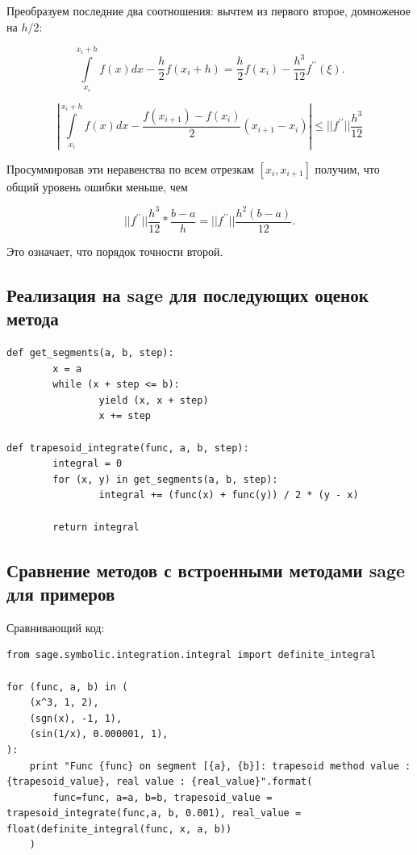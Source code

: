 \documentclass{article}
\theoremstyle{definition}
\theoremstyle{remark}
\newcommand{\lfrac} [2] {\displaystyle \frac{#1}{#2}}
\begin{document}
Преобразуем последние два соотношения: вычтем из первого второе, домноженое на $h/2$:

$$
\int\limits_{x_i}^{x_i + h} f(x) dx - \lfrac{h}{2} f(x_i + h) = \lfrac{h}{2} f(x_i)  - \lfrac{h^3}{12} f^{\prime\prime}(\xi).
$$

$$
\left| \int\limits_{x_i}^{x_i + h} f(x) dx - \lfrac{f(x_{i + 1}) - f(x_i)}{2}(x_{i + 1} - x_i)\right| \leq ||f^{\prime\prime}||\lfrac{h^3}{12}
$$

Просуммировав эти неравенства по всем отрезкам $[x_i, x_{i + 1}]$ получим, что общий уровень ошибки меньше, чем

$$
||f^{\prime\prime}||\lfrac{h^3}{12} * \lfrac{b-a}{h} = ||f^{\prime\prime}||\lfrac{h^2(b - a)}{12}.
$$

Это означает, что порядок точности второй.

\subsection{Реализация на sage для последующих оценок метода}

\begin{lstlisting}
def get_segments(a, b, step):
        x = a
        while (x + step <= b):
                yield (x, x + step)
                x += step

def trapesoid_integrate(func, a, b, step):
        integral = 0
        for (x, y) in get_segments(a, b, step):
                integral += (func(x) + func(y)) / 2 * (y - x)

        return integral
\end{lstlisting}

\subsection{Сравнение методов с встроенными методами sage для примеров}

Сравнивающий код:

\begin{lstlisting}
from sage.symbolic.integration.integral import definite_integral

for (func, a, b) in (
	(x^3, 1, 2),
	(sgn(x), -1, 1),
	(sin(1/x), 0.000001, 1),
):
	print "Func {func} on segment [{a}, {b}]: trapesoid method value : {trapesoid_value}, real value : {real_value}".format(
		func=func, a=a, b=b, trapesoid_value = trapesoid_integrate(func,a, b, 0.001), real_value = float(definite_integral(func, x, a, b))
	)
\end{lstlisting}
\end{document}
